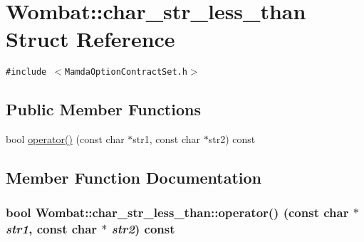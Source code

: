 \hypertarget{structWombat_1_1char__str__less__than}{
\section{Wombat::char\_\-str\_\-less\_\-than Struct Reference}
\label{structWombat_1_1char__str__less__than}
}
{\tt \#include $<$Mamda\-Option\-Contract\-Set.h$>$}

\subsection*{Public Member Functions}
\begin{CompactItemize}
\item 
bool \hyperlink{structWombat_1_1char__str__less__than_a3ef17cc82bedeffee0e95cbc2b88b69}{operator()} (const char $\ast$str1, const char $\ast$str2) const 
\end{CompactItemize}


\subsection{Member Function Documentation}
\hypertarget{structWombat_1_1char__str__less__than_a3ef17cc82bedeffee0e95cbc2b88b69}{
\subsubsection[operator()]{\setlength{\rightskip}{0pt plus 5cm}bool Wombat::char\_\-str\_\-less\_\-than::operator() (const char $\ast$ {\em str1}, const char $\ast$ {\em str2}) const}}
\label{structWombat_1_1char__str__less__than_a3ef17cc82bedeffee0e95cbc2b88b69}


